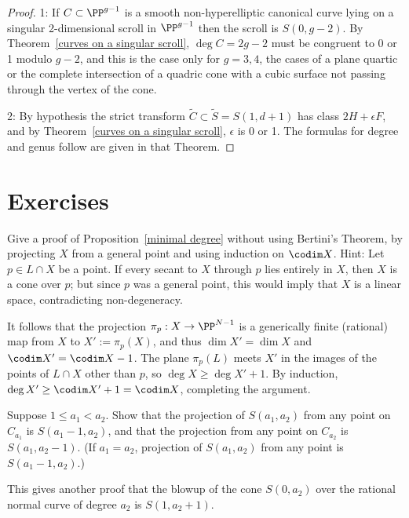 \begin{proof} 1: If $C\subset \PP^{g-1}$ is a smooth non-hyperelliptic canonical curve lying on a singular 2-dimensional scroll in $\PP^{g-1}$
then the scroll is $S(0, g-2)$. By Theorem~\ref{curves on a singular scroll}, $\deg C = 2g-2$ must be congruent
to 0 or 1 modulo $g-2$, and this is the case only for $g=3,4$, the cases of a plane quartic or the complete intersection
of a quadric cone with a cubic surface not passing through the vertex of the cone.

2: By hypothesis the strict transform $\widetilde C\subset  \widetilde S = S(1, d+1)$
has class $2H+\epsilon F$,  and by Theorem~\ref{curves on a singular scroll}, $\epsilon$ is 0 or 1.
The formulas for degree and genus follow are given in that Theorem.
\end{proof}
\section{Exercises}

\begin{exercise}
 Give a proof of Proposition~\ref{minimal degree} without using Bertini's Theorem, by projecting $X$ from a general point and using induction on $\codim X$.
 Hint: Let $p\in L\cap X$ be a point. If every secant to $X$ through $p$ lies entirely in $X$, then $X$ is a cone over $p$; but since $p$ was a general point, this would imply that $X$ is a linear space, contradicting non-degeneracy. 

It follows that the projection $\pi_{p}:X \to \PP^{N-1}$ is a generically finite (rational) map from $X$ to $X' := \pi_{p}(X)$,
and thus $\dim X' = \dim X$ and $\codim X' = \codim X-1$. The plane 
$\pi_{p}(L)$ meets $X'$ in the images of the points of $L\cap X$ other than $p$, so
$\deg X\geq \deg X'+1$. By induction, $\deg X' \geq \codim X'+1 = \codim X$, completing the argument.
\end{exercise}

\begin{exercise}\label{special projections}
Suppose $1\leq a_1 < a_2$. Show that the projection of $S(a_1,a_2)$ from any point on $C_{a_1}$ is 
$S(a_1-1, a_2)$, and that the projection from any point on $C_{a_2}$ is $S(a_1, a_2-1)$. (If $a_1 = a_2$, projection of $S(a_1,a_2)$ from any point is $S(a_1-1, a_2)$.)

This gives another proof that the blowup of the cone $S(0,a_2)$ over the rational normal curve of degree $a_2$ is $S(1,a_2+1)$.  
\end{exercise}

